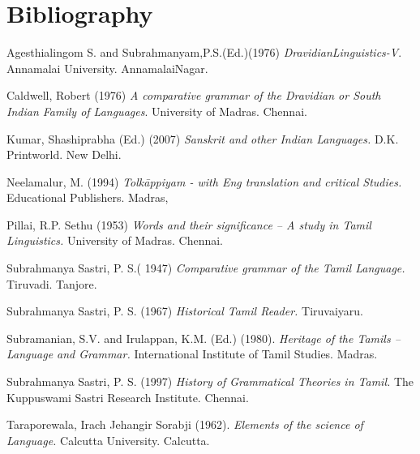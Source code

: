 \section*{Bibliography}

\begin{thebibliography}{99}
 Agesthialingom S. and Subrahmanyam,P.S.(Ed.)(1976) \textit{Dravidian\-Linguistics-V}. Annamalai University. AnnamalaiNagar.

  Caldwell, Robert (1976) \textit{A comparative grammar of the Dravidian or South Indian Family of Languages}. University of Madras. Chennai.

  Kumar, Shashiprabha (Ed.) (2007) \textit{Sanskrit and other Indian Languages.} D.K. Printworld. New Delhi.

  Neelamalur, M. (1994) \textit{Tolkāppiyam - with Eng translation and critical Studies.} Educational Publishers. Madras, 

  Pillai, R.P. Sethu (1953) \textit{Words and their significance – A study in Tamil Linguistics.} University of Madras. Chennai.

  Subrahmanya Sastri, P. S.( 1947) \textit{Comparative grammar of the Tamil Language.} Tiruvadi. Tanjore.

  Subrahmanya Sastri, P. S. (1967) \textit{Historical Tamil Reader.} Tiruvaiyaru.

  Subramanian, S.V. and Irulappan, K.M. (Ed.) (1980). \textit{Heritage of the Tamils – Language and Grammar.} International Institute of Tamil Studies. Madras.

  Subrahmanya Sastri, P. S. (1997) \textit{History of Grammatical Theories in Tamil.} The Kuppuswami Sastri Research Institute. Chennai.

  Taraporewala, Irach Jehangir Sorabji (1962). \textit{Elements of the science of Language.} Calcutta University. Calcutta.

 \end{thebibliography}

\theendnotes

